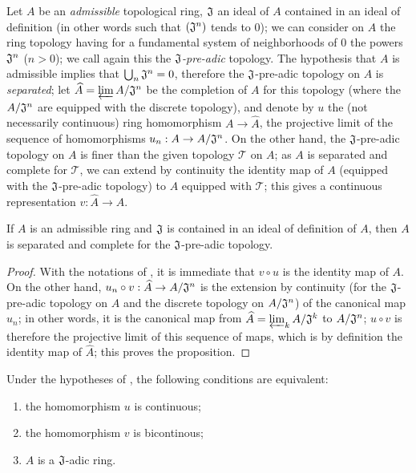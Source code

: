 \begin{env}[7.2.3]
\label{0.7.2.3}
Let $A$ be an {\em admissible} topological ring, $\mathfrak{J}$ an ideal of $A$
contained in an ideal of definition (in other words  such that
$(\mathfrak{J}^n)$ tends to $0$); we can consider on $A$ the ring topology
having for a fundamental system of neighborhoods of $0$ the powers
$\mathfrak{J}^n$ ($n>0$); we call again this the {\em $\mathfrak{J}$-pre-adic}
topology. The hypothesis that $A$ is admissible implies that
$\bigcup_n\mathfrak{J}^n=0$, therefore the $\mathfrak{J}$-pre-adic topology on
$A$ is {\em separated}; let $\widehat{A}=\varprojlim A/\mathfrak{J}^n$ be the
completion of $A$ for this topology (where the $A/\mathfrak{J}^n$ are equipped
with the discrete topology), and denote by $u$ the (not necessarily continuous)
ring homomorphism $A\to\widehat{A}$, the projective limit of the sequence of
homomorphisms $u_n:A\to A/\mathfrak{J}^n$. On the other hand, the
$\mathfrak{J}$-pre-adic topology on $A$ is finer than the given topology
$\mathcal{T}$ on $A$; as $A$ is separated and complete for $\mathcal{T}$, we can
extend by continuity the identity map of $A$ (equipped with the
$\mathfrak{J}$-pre-adic topology) to $A$ equipped with $\mathcal{T}$; this
gives a continuous representation $v:\widehat{A}\to A$.
\end{env}

\begin{prop}[7.2.4]
\label{0.7.2.4}
If $A$ is an admissible ring and $\mathfrak{J}$ is contained in an ideal of
definition of $A$, then $A$ is separated and complete for the
$\mathfrak{J}$-pre-adic topology.
\end{prop}

\begin{proof}
\label{proof-0.7.2.4}
With the notations of , it is immediate that
$v\circ u$ is the identity map of $A$. On the other hand,
$u_n\circ v:\widehat{A}\to A/\mathfrak{J}^n$ is the extension by continuity (for
the $\mathfrak{J}$-pre-adic topology on $A$ and the discrete topology on
$A/\mathfrak{J}^n$) of the canonical map $u_n$; in other words, it is the
canonical map from $\widehat{A}=\varprojlim_k A/\mathfrak{J}^k$ to
$A/\mathfrak{J}^n$; $u\circ v$ is therefore the projective limit of this
sequence of maps, which is by definition the identity map of
$\widehat{A}$; this proves the proposition.
\end{proof}

\begin{cor}[7.2.5]
\label{0.7.2.5}
Under the hypotheses of , the following conditions are
equivalent:
\begin{enumerate}[label={\rm(\alph*)}]
  \item the homomorphism $u$ is continuous;
  \item the homomorphism $v$ is bicontinous;
  \item $A$ is a $\mathfrak{J}$-adic ring.
\end{enumerate}
\end{cor}

